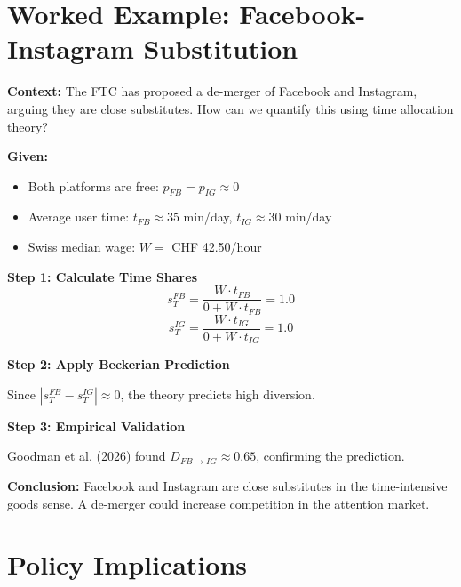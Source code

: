 
\section{Worked Example: Facebook-Instagram Substitution}
\label{sec:pt-platform-application}

\begin{tcolorbox}[colback=blue!5!white, colframe=blue!75!black,
    title=Case Study: UNMAPPED_CAS-853]

\textbf{Context:} The FTC has proposed a de-merger of Facebook and Instagram, arguing they are close substitutes. How can we quantify this using time allocation theory?

\textbf{Given:}
\begin{itemize}[nosep]
\item Both platforms are free: $p_{FB} = p_{IG} \approx 0$
\item Average user time: $t_{FB} \approx 35$ min/day, $t_{IG} \approx 30$ min/day
\item Swiss median wage: $W = $ CHF 42.50/hour
\end{itemize}

\textbf{Step 1: Calculate Time Shares}
\[
s_T^{FB} = \frac{W \cdot t_{FB}}{0 + W \cdot t_{FB}} = 1.0
\]
\[
s_T^{IG} = \frac{W \cdot t_{IG}}{0 + W \cdot t_{IG}} = 1.0
\]

\textbf{Step 2: Apply Beckerian Prediction}

Since $|s_T^{FB} - s_T^{IG}| \approx 0$, the theory predicts high diversion.

\textbf{Step 3: Empirical Validation}

Goodman et al. (2026) found $D_{FB \to IG} \approx 0.65$, confirming the prediction.

\textbf{Conclusion:} Facebook and Instagram are close substitutes in the time-intensive goods sense. A de-merger could increase competition in the attention market.

\end{tcolorbox}

\section{Policy Implications}
\label{sec:pt-policy}

